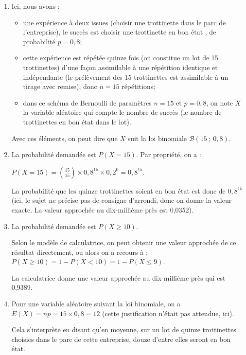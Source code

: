 \documentclass[10pt]{article}
\begin{document}
	\begin{enumerate}
		\item 	Ici, nous avons :
		\begin{itemize}
			\item une expérience à deux issues (choisir une trottinette dans le parc de l'entreprise), le succès est \og choisir une trottinette en bon état \fg{}, de probabilité $p = 0,8$;
			\item cette expérience est répétée quinze fois (on constitue un lot de 15 trottinettes) d'une façon assimilable à une répétition identique et indépendante (le prélèvement des 15 trottinettes est assimilable à un tirage avec remise), donc $n=15$ répétitions;
			\item dans ce schéma de Bernoulli de paramètres $n=15$ et $p=0,8$, on note $X$ la variable aléatoire qui compte le nombre de succès (le nombre de trottinettes en bon état dans le lot).
		\end{itemize}
Avec ces éléments, on peut dire que $X$ suit la loi binomiale $ \mathcal{B}\left(15 ~;~ 0,8\right) $.

	\item La probabilité demandée est $P(X = 15)$. Par propriété, on a :

$\displaystyle P(X=15) = \binom{15}{15} \times 0,8^{15} \times 0,2^0 = 0,8^{15}$.

La probabilité que les quinze trottinettes soient en bon état est donc de $0,8^{15}$ (ici, le sujet ne précise pas de consigne d'arrondi, donc on donne la valeur exacte. La valeur approchée au dix-millième près est 0,0352).

	\item La probabilité demandée est $P(X \geqslant 10)$.

Selon le modèle de calculatrice, on peut obtenir une valeur approchée de ce résultat directement, ou alors on a recours à : $P(X \geqslant 10) = 1 - P(X <10) = 1 - P(X \leqslant 9)$.

La calculatrice donne une valeur approchée au dix-millième près qui est 0,9389.

	\item Pour une variable aléatoire suivant la loi binomiale, on a $E(X) = np = 15 \times 0,8 = 12$ (cette justification n'était pas attendue, ici).

Cela s'interprète en disant qu'en moyenne, sur un lot de quinze trottinettes choisies dans le parc de cette entreprise, douze d'entre elles seront en bon état.
\end{enumerate}

\bigskip
\end{document}
